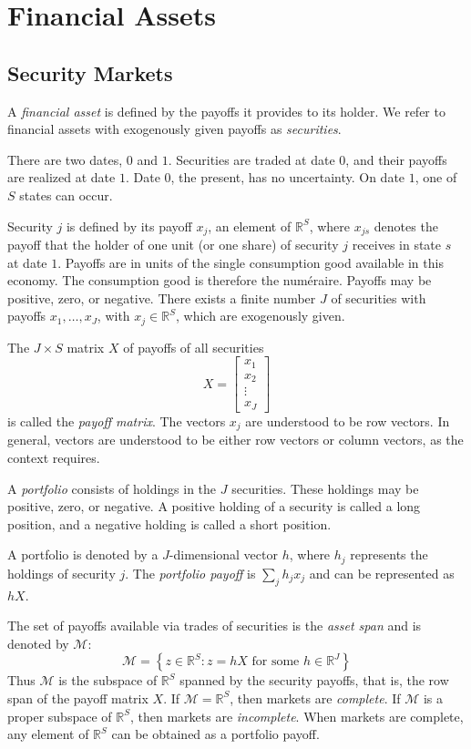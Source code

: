 \documentclass[\topdir/lecture\_notes.tex]{subfiles}
\begin{document}
\section{Financial Assets}
\subsection{Security Markets}
A \emph{financial asset} is defined by the payoffs it provides to its holder. We refer to financial assets with exogenously given payoffs as \emph{securities}.

There are two dates, \(0\) and \(1\). Securities are traded at date \(0\), and their payoffs are realized at date \(1\). Date \(0\), the present, has no uncertainty. On date \(1\), one of \(S\) states can occur.

Security \(j\) is defined by its payoff \(x_{j}\), an element of \(\mathbb{R}^{S}\), where \(x_{js}\) denotes the payoff that the holder of one unit (or one share) of security \(j\) receives in state \(s\) at date \(1\).  Payoffs are in units of the single consumption good available in this economy. The consumption good is therefore the num\'eraire. Payoffs may be positive, zero, or negative. There exists a finite number \(J\) of securities with payoffs \(x_{1}, \ldots, x_{J}\), with \(x_{j} \in \mathbb{R}^{S}\), which are exogenously given.

The \(J \times S\) matrix \(X\) of payoffs of all securities
\[
X=\left[\begin{array}{c}
x_{1} \\
x_{2} \\
\vdots \\
x_{J}
\end{array}\right]
\]
is called the \emph{payoff matrix}. The vectors \(x_{j}\) are understood to be row vectors. In general, vectors are understood to be either row vectors or column vectors, as the context requires.

A \emph{portfolio} consists of holdings in the \(J\) securities. These holdings may be positive, zero, or negative. A positive holding of a security  is called a long position, and a negative holding is called a short position.

A portfolio is denoted by a \(J\)-dimensional vector \(h\), where \(h_{j}\) represents the holdings of security \(j\). The \emph{portfolio payoff} is \(\sum_{j} h_{j} x_{j}\) and can be represented as \(h X\).

The set of payoffs available via trades of securities is the \emph{asset span} and is denoted by \(\mathcal{M}\):
\begin{equation*}
\mathcal{M}=\left\{z \in \mathbb{R}^{S} \colon z=h X \text { for some } h \in \mathbb{R}^{J}\right\} 
\end{equation*}
Thus \(\mathcal{M}\) is the subspace of \(\mathbb{R}^{S}\) spanned by the security payoffs, that is, the row span of the payoff matrix \(X\). If \(\mathcal{M}=\mathbb{R}^{S}\), then markets are \emph{complete}. If \(\mathcal{M}\) is a proper subspace of \(\mathbb{R}^{S}\), then markets are \emph{incomplete}. When markets are complete, any element of \(\mathbb{R}^{S}\) can be obtained as a portfolio payoff.
\end{document}
